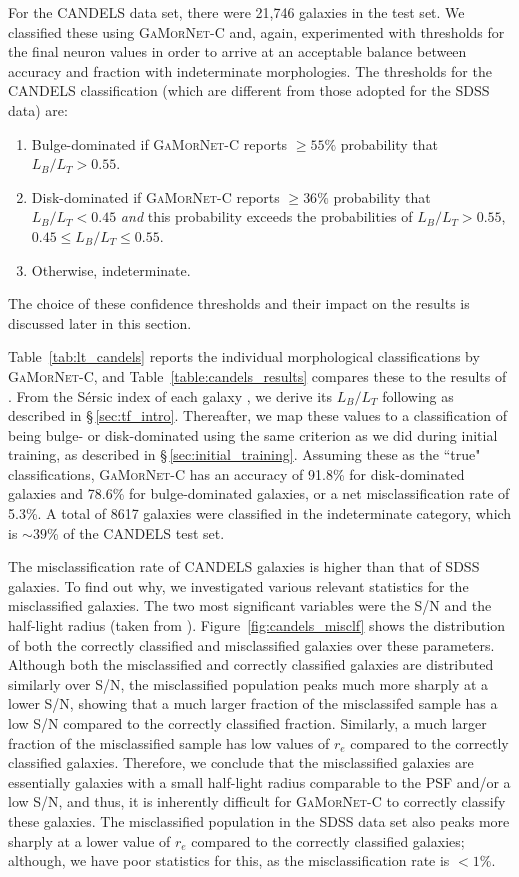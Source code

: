 \documentclass[twocolumn]{aastex63}
\newcommand\sersic{S\'ersic}
\newcommand\gamornet{G\textsc{a}M\textsc{or}N\textsc{et}}
\begin{document}
For the CANDELS data set, there were 21,746 galaxies in the test set. We classified these using \gamornet{}-C and, again, experimented with thresholds for the final neuron values in order to arrive at an acceptable balance between accuracy and fraction with indeterminate morphologies. The thresholds for the CANDELS classification (which are different from those adopted for the SDSS data) are:
\begin{enumerate}[noitemsep]
    \item Bulge-dominated if \gamornet{}-C reports $\geq 55\%$ probability that $L_B/L_T > 0.55 $.
    \item Disk-dominated if \gamornet{}-C reports $\geq 36\%$ probability that $L_B/L_T < 0.45 $ {\it and} this probability exceeds the probabilities of $L_B/L_T > 0.55 $, $0.45 \leq L_B/L_T \leq 0.55 $.
    \item Otherwise, indeterminate.
\end{enumerate}
The choice of these confidence thresholds and their impact on the results is discussed later in this section. 

Table~\ref{tab:lt_candels} reports the individual morphological classifications by \gamornet{}-C, and
Table~\ref{table:candels_results} compares these to the results of \citet{vdw_12}. From the \sersic{} index of each galaxy \citep{vdw_12}, we derive its $L_B/L_T$ following \citet{simmons_08} as described in \S\,\ref{sec:tf_intro}. Thereafter, we map these values to a classification of being bulge- or disk-dominated using the same criterion as we did during initial training, as described in \S\,\ref{sec:initial_training}. Assuming these as the ``true" classifications, \gamornet{}-C has an accuracy of 91.8\% for disk-dominated galaxies and 78.6\% for bulge-dominated galaxies, or a net misclassification rate of 5.3\%. A total of 8617 galaxies were classified in the indeterminate category, which is $\sim39$\% of the CANDELS test set. 

The misclassification rate of CANDELS galaxies is higher than that of SDSS galaxies. To find out why, we investigated various relevant statistics for the misclassified galaxies. The two most significant variables were the S/N and the half-light radius (taken from \citealp{vdw_12}). Figure~\ref{fig:candels_misclf} shows the distribution of both the correctly classified and misclassified galaxies over these parameters. Although both the misclassified and correctly classified galaxies are distributed similarly over S/N, the misclassified population peaks much more sharply at a lower S/N, showing that a much larger fraction of the misclassifed sample has a low S/N compared to the correctly classified fraction. Similarly, a much larger fraction of the misclassified sample has low values of $r_e$ compared to the correctly classified galaxies. Therefore, we conclude that the misclassified galaxies are essentially galaxies with a small half-light radius comparable to the PSF and/or a low S/N, and thus, it is inherently difficult for \gamornet{}-C to correctly classify these galaxies. The misclassified population in the SDSS data set also peaks more sharply at a lower value of $r_e$ compared to the correctly classified galaxies; although, we have poor statistics for this, as the misclassification rate is $<1\%$. 
\end{document}
